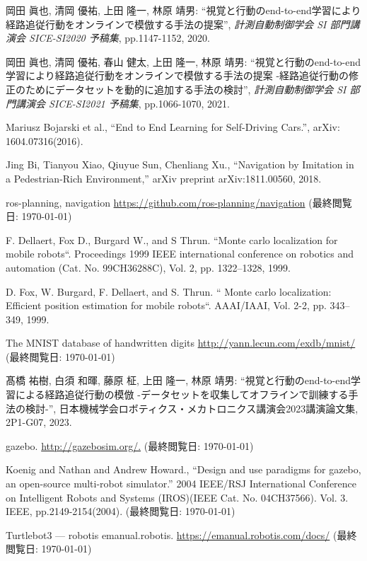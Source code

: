 
\begin{thebibliography}{99}

  岡田 眞也, 清岡 優祐, 上田 隆一, 林原 靖男: ``視覚と行動のend-to-end学習により経路追従行動をオンラインで模倣する手法の提案'', \textit{計測自動制御学会 SI 部門講演会 SICE-SI2020 予稿集}, pp.1147-1152, 2020.

  岡田 眞也, 清岡 優祐, 春山 健太, 上田 隆一, 林原 靖男: ``視覚と行動のend-to-end学習により経路追従行動をオンラインで模倣する手法の提案 -経路追従行動の修正のためにデータセットを動的に追加する手法の検討'', \textit{計測自動制御学会 SI 部門講演会 SICE-SI2021 予稿集}, pp.1066-1070, 2021.

  Mariusz Bojarski et al., ``End to End Learning for Self-Driving Cars.'', arXiv: 1604.07316(2016). 

  Jing Bi, Tianyou Xiao, Qiuyue Sun, Chenliang Xu., ``Navigation by Imitation in a Pedestrian-Rich Environment,'' arXiv preprint arXiv:1811.00560, 2018.

  ros-planning, navigation
  \url{https://github.com/ros-planning/navigation}
  (最終閲覧日: \today)

  F. Dellaert, Fox D., Burgard W., and S Thrun. “Monte carlo localization for mobile robots“. Proceedings 1999 IEEE international conference on robotics and automation (Cat. No. 99CH36288C), Vol. 2, pp. 1322–1328, 1999.

  D. Fox, W. Burgard, F. Dellaert, and S. Thrun. “ Monte carlo localization: Efficient position estimation for mobile robots“. AAAI/IAAI, Vol. 2-2, pp. 343–349, 1999.

  The MNIST database of handwritten digits
  \url{http://yann.lecun.com/exdb/mnist/}
  (最終閲覧日: \today)

  \clearpage
  髙橋 祐樹, 白須 和暉, 藤原 柾, 上田 隆一, 林原 靖男: ``視覚と行動のend-to-end学習による経路追従行動の模倣 -データセットを収集してオフラインで訓練する手法の検討-'', 日本機械学会ロボティクス・メカトロニクス講演会2023講演論文集, 2P1-G07, 2023.

  gazebo.
  \url{http://gazebosim.org/.}
  (最終閲覧日: \today)

  Koenig and Nathan and Andrew Howard., ``Design and use paradigms for gazebo, an open-source multi-robot simulator.'' 2004 IEEE/RSJ International Conference on Intelligent Robots and Systems (IROS)(IEEE Cat. No. 04CH37566). Vol. 3. IEEE, pp.2149-2154(2004).
  (最終閲覧日: \today)

  Turtlebot3 — robotis emanual.robotis.
  \url{https://emanual.robotis.com/docs/}
  (最終閲覧日: \today)

\end{thebibliography}